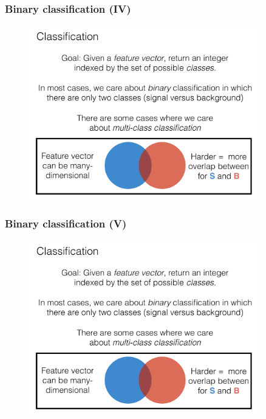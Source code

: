 \documentclass[hyperref={colorlinks=true}]{beamer}
\begin{document}

\begin{frame}%
  \frametitle{Binary classification (IV)}

  \vspace{-0.0cm}

  \begin{figure}
    \centering 
    \includegraphics[width=0.9\textwidth,page=6]{ClassifierSlides.pdf}
  \end{figure}

    
\end{frame}


\begin{frame}%
  \frametitle{Binary classification (V)}

  \vspace{-0.0cm}

  \begin{figure}
    \centering 
    \includegraphics[width=0.9\textwidth,page=7]{ClassifierSlides.pdf}
  \end{figure}

    
\end{frame}
\end{document}
